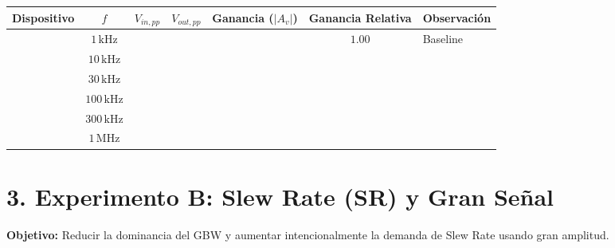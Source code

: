 \documentclass[11pt, a4paper]{article}
\begin{document}
\begin{table}[h!]
    \centering
    \footnotesize
    \renewcommand{\arraystretch}{1.3}
    \begin{tabularx}{\textwidth}{|>{\hsize=1.2\hsize}X|c|c|c|c|c|>{\hsize=0.8\hsize}X|}
    \hline
    \textbf{Dispositivo} & \textbf{$f$} & \textbf{$V_{in,pp}$} & \textbf{$V_{out,pp}$} & \textbf{Ganancia ($|A_v|$)} & \textbf{Ganancia Relativa} & \textbf{Observación} \\ \hline
    & $1\,\text{kHz}$ & & & & $1.00$ & Baseline \\ \hline
    & $10\,\text{kHz}$ & & & & & \\ \hline
    & $30\,\text{kHz}$ & & & & & \\ \hline
    & $100\,\text{kHz}$ & & & & & \\ \hline
    & $300\,\text{kHz}$ & & & & & \\ \hline
    & $1\,\text{MHz}$ & & & & & \\ \hline
    \end{tabularx}
\end{table}

\newpage
\section*{3. Experimento B: Slew Rate (SR) y Gran Señal}
\textbf{Objetivo:} Reducir la dominancia del GBW y aumentar intencionalmente la demanda de Slew Rate usando gran amplitud.
\end{document}
